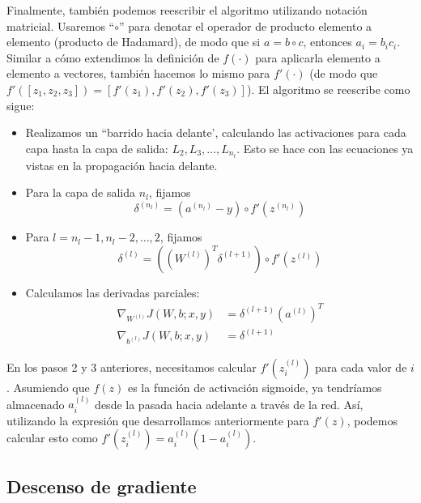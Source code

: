 Finalmente, también podemos reescribir el algoritmo utilizando notación matricial. Usaremos ``$\circ$'' para denotar el operador de producto elemento a elemento (producto de Hadamard), de modo que si $a = b \circ c$, entonces $a_i = b_i c_i$. Similar a cómo extendimos la definición de $f(\cdot)$ para aplicarla elemento a elemento a vectores, también hacemos lo mismo para $f'(\cdot)$ (de modo que $f'([z_1,z_2,z_3]) = [f'(z_1), f'(z_2), f'(z_3)]$). El algoritmo se reescribe como sigue:
\begin{itemize}
\item Realizamos un ``barrido hacia delante', calculando las activaciones para cada capa hasta la capa de salida: $L_2, L_3, \dots, L_{n_l}$. Esto se hace con las ecuaciones ya vistas en la propagación hacia delante.
\item Para la capa de salida $n_l$, fijamos
\begin{equation}
\delta^{(n_l)} = (a^{(n_l)} - y) \circ f'(z^{(n_l)})
\end{equation}
\item Para $l = n_l - 1, n_l - 2, \dots, 2$, fijamos
\begin{equation}
\delta^{(l)} = ((W^{(l)})^T \delta^{(l+1)}) \circ f'(z^{(l)})
\end{equation}
\item Calculamos las derivadas parciales:
\begin{align}
\nabla_{W^{(l)}} J(W, b; x, y) &= \delta^{(l+1)} (a^{(l)})^T \\
\nabla_{b^{(l)}} J(W, b; x, y) &= \delta^{(l+1)}
\end{align}
\end{itemize}

En los pasos 2 y 3 anteriores, necesitamos calcular $f'(z^{(l)}_i)$ para cada valor de $i$. Asumiendo que $f(z)$ es la función de activación sigmoide, ya tendríamos almacenado $a^{(l)}_i$ desde la pasada hacia adelante a través de la red. Así, utilizando la expresión que desarrollamos anteriormente para $f'(z)$, podemos calcular esto como $f'(z^{(l)}_i) = a^{(l)}_i(1 - a^{(l)}_i)$.

\subsection{Descenso de gradiente}

